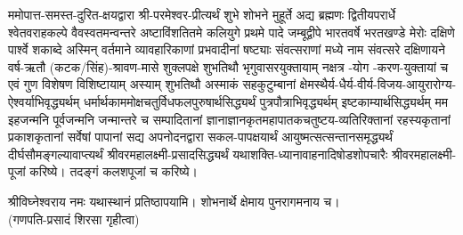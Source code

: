 



\shuklambaradharam


ममोपात्त-समस्त-दुरित-क्षयद्वारा श्री-परमेश्वर-प्रीत्यर्थं शुभे शोभने मुहूर्ते अद्य ब्रह्मणः
द्वितीयपरार्धे श्वेतवराहकल्पे वैवस्वतमन्वन्तरे अष्टाविंशतितमे कलियुगे प्रथमे पादे
जम्बूद्वीपे भारतवर्षे भरतखण्डे मेरोः दक्षिणे पार्श्वे शकाब्दे अस्मिन् वर्तमाने व्यावहारिकाणां प्रभवादीनां षष्ट्याः संवत्सराणां मध्ये \blank{} नाम संवत्सरे दक्षिणायने
वर्ष-ऋतौ (कटक/सिंह)-श्रावण-मासे शुक्लपक्षे \blank{} शुभतिथौ भृगुवासरयुक्तायाम्
\blank{} नक्षत्र \blank{}-योग \blank{}-करण-युक्तायां च एवं गुण विशेषण विशिष्टायाम्
अस्याम् \blank{} शुभतिथौ
अस्माकं सहकुटुम्बानां क्षेमस्थैर्य-धैर्य-वीर्य-विजय-आयुरारोग्य-ऐश्वर्याभिवृद्ध्यर्थम्
 धर्मार्थकाममोक्ष\-चतुर्विधफलपुरुषार्थसिद्ध्यर्थं पुत्रपौत्राभि\-वृद्ध्यर्थम् इष्टकाम्यार्थसिद्ध्यर्थम्
मम इहजन्मनि पूर्वजन्मनि जन्मान्तरे च सम्पादितानां ज्ञानाज्ञानकृतमहा\-पातकचतुष्टय-व्यतिरिक्तानां रहस्यकृतानां प्रकाशकृतानां सर्वेषां पापानां सद्य अपनोदनद्वारा सकल-पापक्षयार्थं आयुष्मत्सत्सन्तानसमृद्ध्यर्थं दीर्घसौमङ्गल्यावाप्त्यर्थं
श्रीवरमहालक्ष्मी-प्रसादसिद्ध्यर्थं
यथाशक्ति-ध्यानावाहनादिषोडशोपचारैः
श्रीवरमहालक्ष्मी-पूजां करिष्ये। तदङ्गं कलशपूजां च करिष्ये।

श्रीविघ्नेश्वराय नमः यथास्थानं प्रतिष्ठापयामि। शोभनार्थे क्षेमाय पुनरागमनाय च।\\
(गणपति-प्रसादं शिरसा गृहीत्वा)





\begingroup
\renewcommand{\devaName}{देवि}

\endgroup







